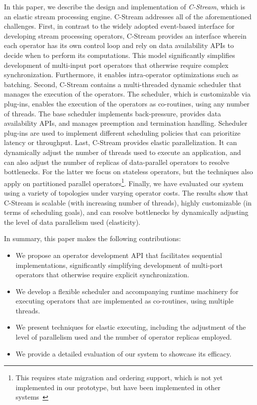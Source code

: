 In this paper, we describe the design and implementation of \emph{C-Stream},
which is an elastic stream processing engine. C-Stream addresses all of the
aforementioned challenges.  First, in contrast to the widely adopted
event-based interface for developing stream processing operators, C-Stream
provides an interface wherein each operator has its own control loop and rely
on data availability APIs to decide when to perform its computations. This
model significantly simplifies development of multi-input port operators that
otherwise require complex synchronization. Furthermore, it enables
intra-operator optimizations such as batching. Second, C-Stream contains a
multi-threaded dynamic scheduler that manages the execution of the operators.
The scheduler, which is customizable via plug-ins, enables the execution of
the operators as co-routines, using any number of threads. The base scheduler
implements back-pressure, provides data availability APIs, and manages
preemption and termination handling. Scheduler plug-ins are used to implement
different scheduling policies that can prioritize latency or throughput. Last,
C-Stream provides elastic parallelization. It can dynamically adjust the
number of threads used to execute an application, and can also adjust the
number of replicas of data-parallel operators to resolve bottlenecks. For the
latter we focus on stateless operators, but the techniques also apply on
partitioned parallel operators\footnote{This requires state migration and
ordering support, which is not yet implemented in our prototype, but have been
implemented in other systems~\cite{ref:stream-parallel}}. Finally, we have
evaluated our system using a variety of topologies under varying operator
costs. The results show that C-Stream is scalable (with increasing number of
threads), highly customizable (in terms of scheduling goals), and can resolve
bottlenecks by dynamically adjusting the level of data parallelism used
(elasticity).
 
In summary, this paper makes the following contributions:
\begin{itemize}
\item We propose an operator development API that facilitates sequential
implementations, significantly simplifying development of multi-port
operators that otherwise require explicit synchronization.
\item We develop a flexible scheduler and accompanying runtime machinery for
executing operators that are implemented as co-routines, using multiple threads. 
\item We present techniques for elastic executing, including the adjustment of the
level of parallelism used and the number of operator replicas employed.
\item We provide a detailed evaluation of our system to showcase its efficacy.
\end{itemize}

